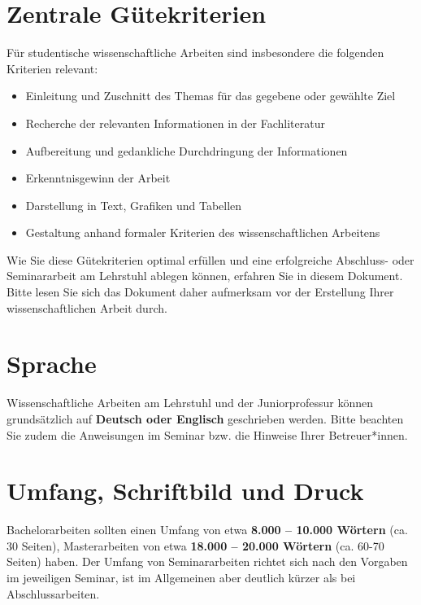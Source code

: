 \documentclass[
  letterpaper,
  DIV=11]{scrreprt}
\begin{document}
\hypertarget{zentrale-guxfctekriterien}{%
\section{Zentrale Gütekriterien}\label{zentrale-guxfctekriterien}}

Für studentische wissenschaftliche Arbeiten sind insbesondere die
folgenden Kriterien relevant:

\begin{itemize}
\item
  Einleitung und Zuschnitt des Themas für das gegebene oder gewählte
  Ziel
\item
  Recherche der relevanten Informationen in der Fachliteratur
\item
  Aufbereitung und gedankliche Durchdringung der Informationen
\item
  Erkenntnisgewinn der Arbeit
\item
  Darstellung in Text, Grafiken und Tabellen
\item
  Gestaltung anhand formaler Kriterien des wissenschaftlichen Arbeitens
\end{itemize}

Wie Sie diese Gütekriterien optimal erfüllen und eine erfolgreiche
Abschluss- oder Seminararbeit am Lehrstuhl ablegen können, erfahren Sie
in diesem Dokument. Bitte lesen Sie sich das Dokument daher aufmerksam
vor der Erstellung Ihrer wissenschaftlichen Arbeit durch.

\hypertarget{sprache}{%
\section{Sprache}\label{sprache}}

Wissenschaftliche Arbeiten am Lehrstuhl und der Juniorprofessur können
grundsätzlich auf \textbf{Deutsch oder Englisch} geschrieben werden.
Bitte beachten Sie zudem die Anweisungen im Seminar bzw. die Hinweise
Ihrer Betreuer*innen.

\hypertarget{umfang-schriftbild-und-druck}{%
\section{Umfang, Schriftbild und
Druck}\label{umfang-schriftbild-und-druck}}

Bachelorarbeiten sollten einen Umfang von etwa \textbf{8.000 -- 10.000
Wörtern} (ca. 30 Seiten), Masterarbeiten von etwa \textbf{18.000 --
20.000 Wörtern} (ca. 60-70 Seiten) haben. Der Umfang von Seminararbeiten
richtet sich nach den Vorgaben im jeweiligen Seminar, ist im Allgemeinen
aber deutlich kürzer als bei Abschlussarbeiten.
\end{document}
